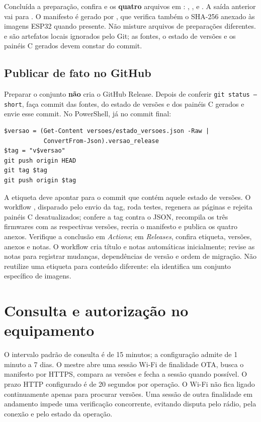 Concluída a preparação, confira  e os \textbf{quatro} arquivos em : , ,  e . A saída anterior vai para . O manifesto é gerado por , que verifica também o SHA-256 anexado às imagens ESP32 quando presente. Não misture arquivos de preparações diferentes.  e  são artefatos locais ignorados pelo Git; as fontes, o estado de versões e os painéis C gerados devem constar do commit.

\subsection{Publicar de fato no GitHub}
Preparar o conjunto \textbf{não} cria o GitHub Release. Depois de conferir \texttt{git status --short}, faça commit das fontes, do estado de versões e dos painéis C gerados e envie esse commit. No PowerShell, já no commit final:
\begin{lstlisting}[caption={Envio do commit e da etiqueta do mesmo conjunto}]
$versao = (Get-Content versoes/estado_versoes.json -Raw |
           ConvertFrom-Json).versao_release
$tag = "v$versao"
git push origin HEAD
git tag $tag
git push origin $tag
\end{lstlisting}
A etiqueta deve apontar para o commit que contém aquele estado de versões. O workflow , disparado pelo envio da tag, roda testes, regenera as páginas e rejeita painéis C desatualizados; confere a tag contra o JSON, recompila os três firmwares com as respectivas versões, recria o manifesto e publica os quatro anexos. Verifique a conclusão em \emph{Actions}; em \emph{Releases}, confira etiqueta, versões, anexos e notas. O workflow cria título e notas automáticas inicialmente; revise as notas para registrar mudanças, dependências de versão e ordem de migração. Não reutilize uma etiqueta para conteúdo diferente: ela identifica um conjunto específico de imagens.

\section{Consulta e autorização no equipamento}
O intervalo padrão de consulta é de 15 minutos; a configuração admite de 1 minuto a 7 dias. O mestre abre uma sessão Wi-Fi de finalidade OTA, busca o manifesto por HTTPS, compara as versões e fecha a sessão quando possível. O prazo HTTP configurado é de 20 segundos por operação. O Wi-Fi não fica ligado continuamente apenas para procurar versões. Uma sessão de outra finalidade em andamento impede uma verificação concorrente, evitando disputa pelo rádio, pela conexão e pelo estado da operação.

